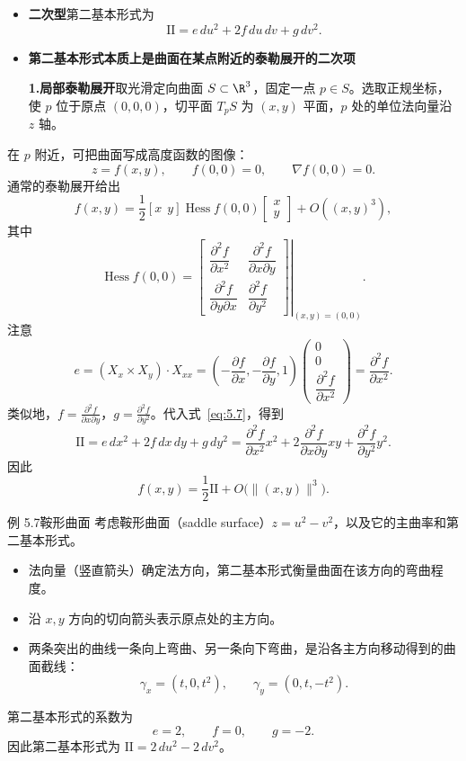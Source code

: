 \begin{itemize}
  \item \textbf{二次型}\quad 第二基本形式为
  \begin{equation*}
    \mathrm{II}=e\,du^2+2f\,du\,dv+g\,dv^2.
    \tag{5.7}\label{eq:5.7}
  \end{equation*}
  \item \textbf{第二基本形式本质上是曲面在某点附近的泰勒展开的二次项}

  \textbf{1.\quad 局部泰勒展开}\quad 取光滑定向曲面 $S\subset\R^3$，固定一点 $p\in S$。选取正规坐标，使 $p$ 位于原点 $(0,0,0)$，切平面 $T_pS$ 为 $(x,y)$ 平面，$p$ 处的单位法向量沿 $z$ 轴。
\end{itemize}

在 $p$ 附近，可把曲面写成高度函数的图像：
\[
  z=f(x,y),\qquad f(0,0)=0,\qquad \nabla f(0,0)=0.
\]
通常的泰勒展开给出
\begin{equation*}
  f(x,y)=\frac12[x\ \ y]\operatorname{Hess}f(0,0)
          \begin{bmatrix}x\\y\end{bmatrix}+O((x,y)^3),
  \tag{5.8}\label{eq:5.8}
\end{equation*}
其中
\[
  \operatorname{Hess}f(0,0)=
  \left.
  \begin{bmatrix}
    \dfrac{\partial^2 f}{\partial x^2} & \dfrac{\partial^2 f}{\partial x\partial y}\\[6pt]
    \dfrac{\partial^2 f}{\partial y\partial x} & \dfrac{\partial^2 f}{\partial y^2}
  \end{bmatrix}
  \right|_{(x,y)=(0,0)}.
\]
注意
\[
  e=(X_x\times X_y)\cdot X_{xx}
    =\left(-\frac{\partial f}{\partial x},-\frac{\partial f}{\partial y},1\right)
      \begin{pmatrix}0\\0\\\dfrac{\partial^2 f}{\partial x^2}\end{pmatrix}
    =\frac{\partial^2 f}{\partial x^2}.
\]
类似地，$f=\frac{\partial^2 f}{\partial x\partial y}$，$g=\frac{\partial^2 f}{\partial y^2}$。代入式~\eqref{eq:5.7}，得到
\[
  \mathrm{II}=e\,dx^2+2f\,dx\,dy+g\,dy^2
    =\frac{\partial^2 f}{\partial x^2}x^2
      +2\frac{\partial^2 f}{\partial x\partial y}xy
      +\frac{\partial^2 f}{\partial y^2}y^2.
\]
因此
\[
  f(x,y)=\frac12\mathrm{II}+O\bigl(\lVert(x,y)\rVert^3\bigr).
\]

\begin{statement}{例 5.7}{鞍形曲面}
考虑鞍形曲面（saddle surface）$z=u^2-v^2$，以及它的主曲率和第二基本形式。
\begin{itemize}
  \item 法向量（竖直箭头）确定法方向，第二基本形式衡量曲面在该方向的弯曲程度。
  \item 沿 $x,y$ 方向的切向箭头表示原点处的主方向。
  \item 两条突出的曲线一条向上弯曲、另一条向下弯曲，是沿各主方向移动得到的曲面截线：
  \[
    \gamma_x=(t,0,t^2),\qquad\gamma_y=(0,t,-t^2).
  \]
\end{itemize}
第二基本形式的系数为
\[
  e=2,\qquad f=0,\qquad g=-2.
\]
因此第二基本形式为 $\mathrm{II}=2\,du^2-2\,dv^2$。
\end{statement}

